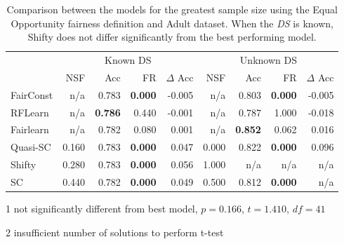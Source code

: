 \begin{table}[H]
\begin{threeparttable}
\centering
\begin{tabular}{lrrrrrrrr}
\toprule
 & \multicolumn{4}{c}{Known DS} & \multicolumn{4}{c}{Unknown DS} \\
 & NSF & Acc & FR & $\Delta$ Acc & NSF & Acc & FR & $\Delta$ Acc \\
\cmidrule(r){2-5} \cmidrule{6-9}
FairConst & n/a & 0.783 & \bfseries 0.000 & -0.005 & n/a & 0.803 & \bfseries 0.000 & -0.005 \\
RFLearn & n/a & \bfseries 0.786 & 0.440 & -0.001 & n/a & 0.787 & 1.000 & -0.018 \\
Fairlearn & n/a & 0.782 & 0.080 & 0.001 & n/a & \bfseries 0.852 & 0.062 & 0.016 \\
Quasi-SC & 0.160 & 0.783 & \bfseries 0.000 & 0.047 & 0.000 & 0.822 & \bfseries 0.000 & 0.096 \\
Shifty & 0.280 & 0.783\tnote{1} & \bfseries 0.000 & 0.056 & 1.000 & n/a\tnote{2} & n/a & n/a \\
SC & 0.440 & 0.782 & \bfseries 0.000 & 0.049 & 0.500 & 0.812 & \bfseries 0.000 & n/a \\
\bottomrule
\end{tabular}
\begin{tablenotes}
\item[1] not significantly different from best model, $p=0.166$, $t=1.410$, $df=41$
\item[2] insufficient number of solutions to perform t-test
\end{tablenotes}
\end{threeparttable}
\caption{Comparison between the models for the greatest sample size using the Equal Opportunity fairness definition and Adult dataset. When the \textit{DS} is known, Shifty does not differ significantly from the best performing model.}
\label{eopp_adult}
\end{table}

